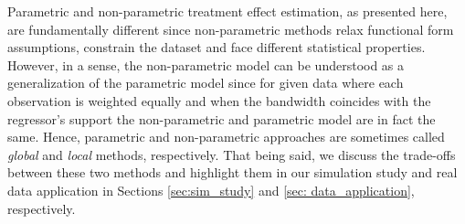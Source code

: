 Parametric and non-parametric treatment effect estimation, as presented here, are fundamentally different since non-parametric methods relax functional form assumptions, constrain the dataset and face different statistical properties. However, in a sense, the non-parametric model can be understood as a generalization of the parametric model since for given data where each observation is weighted equally and when the bandwidth coincides with the regressor's support the non-parametric and parametric model are in fact the same. Hence, parametric and non-parametric approaches are sometimes called \textit{global} and \textit{local} methods, respectively. That being said, we discuss the trade-offs between these two methods and highlight them in our simulation study and real data application in Sections \ref{sec:sim_study} and \ref{sec: data_application}, respectively.
